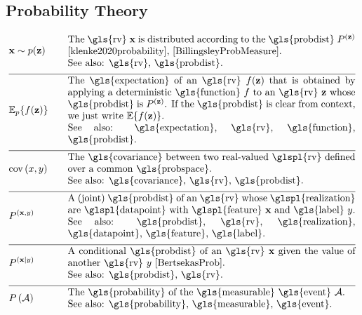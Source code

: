\subsection*{Probability Theory} 
\begin{align}
	&\featurevec \sim p(\vz)  &\quad & \parbox{.85\textwidth}{The \gls{rv} $\featurevec$ is distributed according to 
		the \gls{probdist} $\probdist^{(\vz)}$ \cite{klenke2020probability}, \cite{BillingsleyProbMeasure}.
		\\ See also: \gls{rv}, \gls{probdist}.}  \nonumber \\[2mm] \hline \nonumber\\[-5mm]  
	&\expect_{p} \{ f(\datapoint) \}  &\quad & \parbox{.85\textwidth}{The \gls{expectation} of an \gls{rv} $f(\datapoint)$ that 
		is obtained by applying a deterministic \gls{function} $f$ to an \gls{rv}
		$\datapoint$ whose \gls{probdist} is $\probdist^{(\datapoint)}$. 
		If the \gls{probdist} is clear from context, 
		we just write $\expect \{ f(\datapoint) \}$. 
		\\ See also: \gls{expectation}, \gls{rv}, \gls{function}, \gls{probdist}.}  \nonumber \\[2mm] \hline \nonumber\\[-5mm]
	&\cov{x}{y} &\quad & \parbox{.85\textwidth}{The \gls{covariance} between two real-valued \glspl{rv} defined 
		over a common \gls{probspace}. 
		\\ See also: \gls{covariance}, \gls{rv}, \gls{probdist}.}  \nonumber \\[2mm] \hline \nonumber\\[-5mm]
	&\probdist^{(\featurevec,\truelabel)} &\quad & \parbox{.85\textwidth}{A (joint) \gls{probdist} of an \gls{rv} 
		whose \glspl{realization} are \glspl{datapoint} with \glspl{feature} $\featurevec$ and \gls{label} $\truelabel$.
		\\ See also: \gls{probdist}, \gls{rv}, \gls{realization}, \gls{datapoint}, \gls{feature}, 
		\gls{label}.} \nonumber \\[2mm] \hline \nonumber\\[-5mm]
	&\probdist^{(\featurevec|\truelabel)} &\quad & \parbox{.85\textwidth}{A conditional \gls{probdist} of an \gls{rv} 
		$\featurevec$ given the value of another \gls{rv} $\truelabel$ \cite[Sec.\ 3.5]{BertsekasProb}. 
		\\ See also: \gls{probdist}, \gls{rv}. } \nonumber \\[2mm] \hline \nonumber\\[-5mm]
	&\prob{\mathcal{A}} &\quad & \parbox{.85\textwidth}{The \gls{probability} of the \gls{measurable} \gls{event} $\mathcal{A}$. 
		\\ See also: \gls{probability}, \gls{measurable}, \gls{event}.} \nonumber 
\end{align} 
